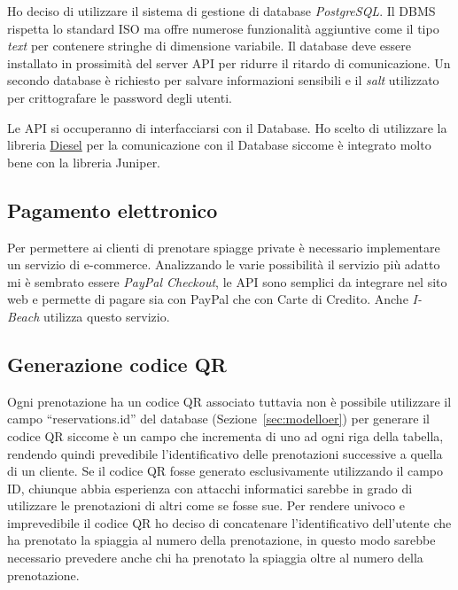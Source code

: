Ho deciso di utilizzare il sistema di gestione di database \emph{PostgreSQL}. Il DBMS rispetta lo standard ISO ma offre numerose funzionalit\`a aggiuntive come il tipo \emph{text} per contenere stringhe di dimensione variabile. Il database deve essere installato in prossimit\`a del server API per ridurre il ritardo di comunicazione. Un secondo database \`e richiesto per salvare informazioni sensibili e il \emph{salt} utilizzato per crittografare le password degli utenti.

Le API si occuperanno di interfacciarsi con il Database. Ho scelto di utilizzare la libreria \href{https://diesel.rs/}{Diesel} per la comunicazione con il Database siccome \`e integrato molto bene con la libreria Juniper.

\subsection{Pagamento elettronico}%
\label{sub:pagamento_elettronico}

Per permettere ai clienti di prenotare spiagge private \`e necessario implementare un servizio di e-commerce. Analizzando le varie possibilit\`a il servizio pi\`u adatto mi \`e sembrato essere \emph{PayPal Checkout}, le API sono semplici da integrare nel sito web e permette di pagare sia con PayPal che con Carte di Credito. Anche \emph{I-Beach} utilizza questo servizio.

\subsection{Generazione codice QR}

Ogni prenotazione ha un codice QR associato tuttavia non \`e possibile utilizzare il campo ``reservations.id'' del database (Sezione~\ref{sec:modelloer}) per generare il codice QR siccome \`e un campo che incrementa di uno ad ogni riga della tabella, rendendo quindi prevedibile l'identificativo delle prenotazioni successive a quella di un cliente. Se il codice QR fosse generato esclusivamente utilizzando il campo ID, chiunque abbia esperienza con attacchi informatici sarebbe in grado di utilizzare le prenotazioni di altri come se fosse sue. Per rendere univoco e imprevedibile il codice QR ho deciso di concatenare l'identificativo dell'utente che ha prenotato la spiaggia al numero della prenotazione, in questo modo sarebbe necessario prevedere anche chi ha prenotato la spiaggia oltre al numero della prenotazione.
